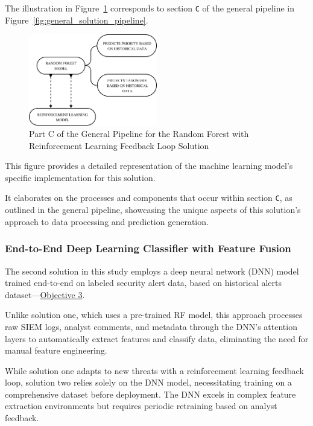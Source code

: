 The illustration in Figure~\ref{fig:solution1_c} corresponds to section \texttt{C} of the general pipeline in Figure~\ref{fig:general_solution_pipeline}. 

\begin{figure}[h!]
    \centering
    \includegraphics[width=0.5\textwidth]{ch3/assets/solution1_C.png}
    \caption{Part C of the General Pipeline for the Random Forest with Reinforcement Learning Feedback Loop Solution}
    \label{fig:solution1_c}
\end{figure}

This figure provides a detailed representation of the machine learning model's specific implementation for this solution. 

It elaborates on the processes and components that occur within section \texttt{C}, as outlined in the general pipeline, showcasing the unique aspects of this solution's approach to data processing and prediction generation.

\subsubsection{End-to-End Deep Learning Classifier with Feature Fusion}
The second solution in this study employs a deep neural network (DNN) model trained end-to-end on labeled security alert data, based on historical alerts dataset—\hyperref[objective3]{Objective 3}. 

Unlike solution one, which uses a pre-trained RF model, this approach processes raw SIEM logs, analyst comments, and metadata through the DNN's attention layers to automatically extract features and classify data, eliminating the need for manual feature engineering.

While solution one adapts to new threats with a reinforcement learning feedback loop, solution two relies solely on the DNN model, necessitating training on a comprehensive dataset before deployment. 
The DNN excels in complex feature extraction environments but requires periodic retraining based on analyst feedback.

